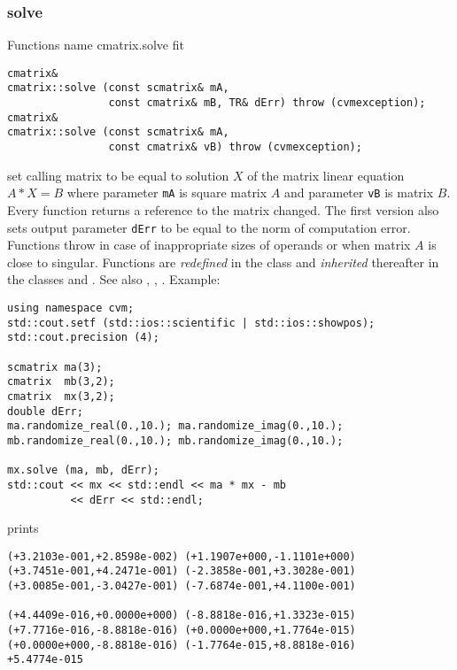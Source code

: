 \subsubsection{solve}
Functions%
\pdfdest name {cmatrix.solve} fit
\begin{verbatim}
cmatrix&
cmatrix::solve (const scmatrix& mA,
                const cmatrix& mB, TR& dErr) throw (cvmexception);
cmatrix&
cmatrix::solve (const scmatrix& mA,
                const cmatrix& vB) throw (cvmexception);
\end{verbatim}
set  calling matrix to be equal to  solution $X$ of the
matrix linear equation
$A*X=B$ where parameter \verb"mA" is square matrix $A$
and parameter \verb"vB" is matrix $B$.
Every function returns a reference to the matrix changed.
The first version also sets output parameter \verb"dErr" to be equal
to the norm of computation error.
Functions throw 
in case of inappropriate sizes
of operands or when matrix $A$ is close to singular.
Functions are \emph{redefined} in the class
 and
\emph{inherited} thereafter in the classes
 and
.
See also
,
,
.
Example:
\begin{Verbatim}
using namespace cvm;
std::cout.setf (std::ios::scientific | std::ios::showpos);
std::cout.precision (4);

scmatrix ma(3);
cmatrix  mb(3,2);
cmatrix  mx(3,2);
double dErr;
ma.randomize_real(0.,10.); ma.randomize_imag(0.,10.);
mb.randomize_real(0.,10.); mb.randomize_imag(0.,10.);

mx.solve (ma, mb, dErr);
std::cout << mx << std::endl << ma * mx - mb
          << dErr << std::endl;
\end{Verbatim}
prints
\begin{Verbatim}
(+3.2103e-001,+2.8598e-002) (+1.1907e+000,-1.1101e+000)
(+3.7451e-001,+4.2471e-001) (-2.3858e-001,+3.3028e-001)
(+3.0085e-001,-3.0427e-001) (-7.6874e-001,+4.1100e-001)

(+4.4409e-016,+0.0000e+000) (-8.8818e-016,+1.3323e-015)
(+7.7716e-016,-8.8818e-016) (+0.0000e+000,+1.7764e-015)
(+0.0000e+000,-8.8818e-016) (-1.7764e-015,+8.8818e-016)
+5.4774e-015
\end{Verbatim}
\newpage




